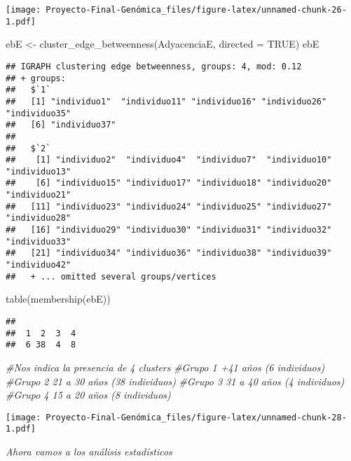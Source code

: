\documentclass[
]{article}
\newenvironment{Shaded}{\begin{snugshade}}{\end{snugshade}}
\newcommand{\AttributeTok}[1]{\textcolor[rgb]{0.77,0.63,0.00}{#1}}
\newcommand{\CommentTok}[1]{\textcolor[rgb]{0.56,0.35,0.01}{\textit{#1}}}
\newcommand{\ConstantTok}[1]{\textcolor[rgb]{0.00,0.00,0.00}{#1}}
\newcommand{\FunctionTok}[1]{\textcolor[rgb]{0.00,0.00,0.00}{#1}}
\newcommand{\NormalTok}[1]{#1}
\newcommand{\OtherTok}[1]{\textcolor[rgb]{0.56,0.35,0.01}{#1}}
\begin{document}
\texttt{[image: Proyecto-Final-Genómica\_files/figure-latex/unnamed-chunk-26-1.pdf]}

\begin{Shaded}
\begin{Highlighting}[]
\NormalTok{ebE }\OtherTok{\textless{}{-}} \FunctionTok{cluster\_edge\_betweenness}\NormalTok{(AdyacenciaE, }\AttributeTok{directed =} \ConstantTok{TRUE}\NormalTok{)}
\NormalTok{ebE}
\end{Highlighting}
\end{Shaded}

\begin{verbatim}
## IGRAPH clustering edge betweenness, groups: 4, mod: 0.12
## + groups:
##   $`1`
##   [1] "individuo1"  "individuo11" "individuo16" "individuo26" "individuo35"
##   [6] "individuo37"
##   
##   $`2`
##    [1] "individuo2"  "individuo4"  "individuo7"  "individuo10" "individuo13"
##    [6] "individuo15" "individuo17" "individuo18" "individuo20" "individuo21"
##   [11] "individuo23" "individuo24" "individuo25" "individuo27" "individuo28"
##   [16] "individuo29" "individuo30" "individuo31" "individuo32" "individuo33"
##   [21] "individuo34" "individuo36" "individuo38" "individuo39" "individuo42"
##   + ... omitted several groups/vertices
\end{verbatim}

\begin{Shaded}
\begin{Highlighting}[]
\FunctionTok{table}\NormalTok{(}\FunctionTok{membership}\NormalTok{(ebE))}
\end{Highlighting}
\end{Shaded}

\begin{verbatim}
## 
##  1  2  3  4 
##  6 38  4  8
\end{verbatim}

\begin{Shaded}
\begin{Highlighting}[]
\CommentTok{\#Nos indica la presencia de 4 clusters}
\CommentTok{\#Grupo 1 +41 años (6 individuos)}
\CommentTok{\#Grupo 2 21 a 30 años (38 individuos)}
\CommentTok{\#Grupo 3 31 a 40 años (4 individuos)}
\CommentTok{\#Grupo 4 15 a 20 años (8 individuos)}
\end{Highlighting}
\end{Shaded}

\texttt{[image: Proyecto-Final-Genómica\_files/figure-latex/unnamed-chunk-28-1.pdf]}

\emph{Ahora vamos a los análisis estadísticos}
\end{document}
